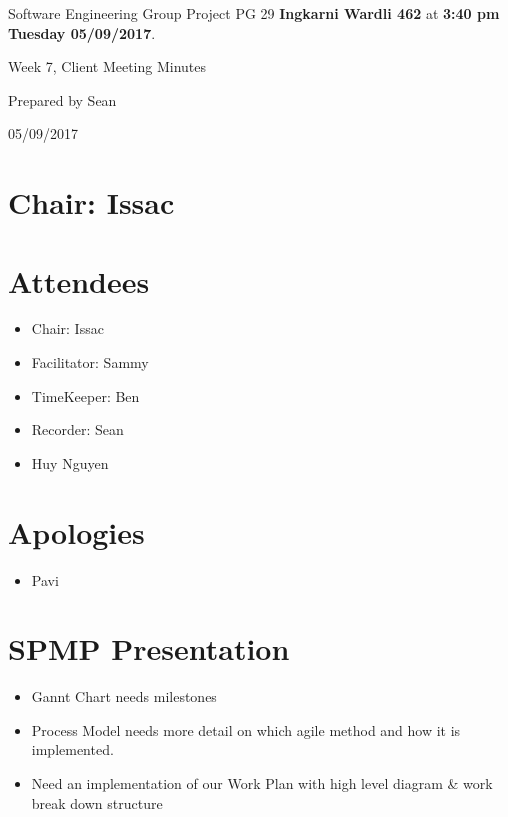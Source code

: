 \documentclass[11pt, a4paper]{article}
\begin{document}
\noindent Software Engineering Group Project PG 29 {\bf Ingkarni Wardli 462} at {\bf 3:40 pm Tuesday 05/09/2017}.
\vspace*{10pt}
\begin{center}
\huge Week 7, Client Meeting Minutes
\end{center}
\vspace*{10pt}
\begin{center}
\huge Prepared by Sean
\end{center}
\begin{center}
\huge 05/09/2017
\end{center}
\section*{Chair: Issac}

\section{Attendees}
\begin{itemize}
\item Chair: Issac
\item Facilitator: Sammy
\item TimeKeeper: Ben
\item Recorder: Sean
\item Huy Nguyen
\end{itemize}



\section{Apologies}
\begin{itemize}
\item Pavi
\end{itemize}


\section{SPMP Presentation}

\begin{itemize}
\item Gannt Chart needs milestones
\item Process Model needs more detail on which agile method and how it is implemented. 
\item Need an implementation of our Work Plan with high level diagram \& work break down structure
\end{itemize}
\end{document}
